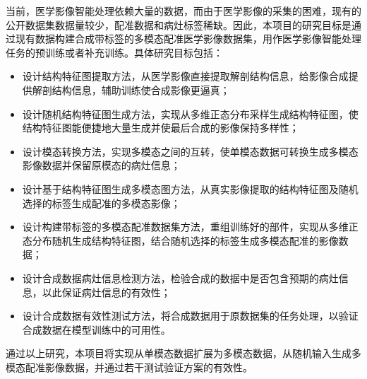 \documentclass[letterpaper]{article} %
\begin{document}
当前，医学影像智能处理依赖大量的数据，而由于医学影像的采集的困难，现有的公开数据集数据量较少，配准数据和病灶标签稀缺。因此，本项目的研究目标是通过现有数据构建合成带标签的多模态配准医学影像数据集，用作医学影像智能处理任务的预训练或者补充训练。具体研究目标包括：
\begin{itemize}
	\item 设计结构特征图提取方法，从医学影像直接提取解剖结构信息，给影像合成提供解剖结构信息，辅助训练使合成影像更逼真；
	\item 设计随机结构特征图生成方法，实现从多维正态分布采样生成结构特征图，使结构特征图能便捷地大量生成并使最后合成的影像保持多样性；
	\item 设计模态转换方法，实现多模态之间的互转，使单模态数据可转换生成多模态影像数据并保留原模态的病灶信息；
	\item 设计基于结构特征图生成多模态图方法，从真实影像提取的结构特征图及随机选择的标签生成配准的多模态影像；
	\item 设计构建带标签的多模态配准数据集方法，重组训练好的部件，实现从多维正态分布随机生成结构特征图，结合随机选择的标签生成多模态配准的影像数据；
	\item 设计合成数据病灶信息检测方法，检验合成的数据中是否包含预期的病灶信息，以此保证病灶信息的有效性；
	\item 设计合成数据有效性测试方法，将合成数据用于原数据集的任务处理，以验证合成数据在模型训练中的可用性。
\end{itemize}	
通过以上研究，本项目将实现从单模态数据扩展为多模态数据，从随机输入生成多模态配准影像数据，并通过若干测试验证方案的有效性。




\end{document}
